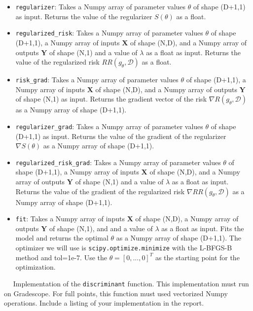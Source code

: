 \documentclass[11pt]{article}
\newcommand{\mbf}[1]{{\mathbf{#1}}}
\begin{document}
\begin{problem}{50}
\begin{itemize}
\item  \verb|regularizer|: Takes a Numpy array of parameter values $\theta$ of shape (D+1,1) as input. Returns the value of the regularizer $S(\theta)$ as a float.

\item  \verb|regularized_risk|: Takes a Numpy array of parameter values $\theta$ of shape (D+1,1), a Numpy array of inputs $\mbf{X}$ of shape (N,D), and a Numpy array of outputs $\mbf{Y}$ of shape (N,1) and a value of $\lambda$ as a float as input. Returns the value of the regularized risk $RR(g_{\theta},\mathcal{D})$ as a float.

\item  \verb|risk_grad|: Takes a Numpy array of parameter values $\theta$ of shape (D+1,1),  a Numpy array of inputs $\mbf{X}$ of shape (N,D), and a Numpy array of outputs $\mbf{Y}$ of shape (N,1) as input. Returns the gradient vector of the risk $\nabla R(g_{\theta},\mathcal{D})$ as a Numpy array of shape (D+1,1).

\item  \verb|regularizer_grad|: Takes a Numpy array of parameter values $\theta$ of shape (D+1,1) as input. Returns the value of the gradient of the regularizer $\nabla S(\theta)$  as a Numpy array of shape (D+1,1).

\item  \verb|regularized_risk_grad|: Takes a Numpy array of parameter values $\theta$ of shape (D+1,1), a Numpy array of inputs $\mbf{X}$ of shape (N,D), and a Numpy array of outputs $\mbf{Y}$ of shape (N,1) and a value of $\lambda$ as a float as input. Returns the value of the gradient of the regularized risk $\nabla RR(g_{\theta},\mathcal{D})$  as a Numpy array of shape (D+1,1).

\item  \verb|fit|: Takes a Numpy array of inputs $\mbf{X}$ of shape (N,D), a Numpy array of outputs $\mbf{Y}$ of shape (N,1), and and a value of $\lambda$ as a float as input. Fits the model and returns the optimal $\theta$ as a Numpy array of shape (D+1,1). The optimizer we will use is \verb|scipy.optimize.minimize| with the L-BFGS-B method and tol=1e-7. Use the $\theta=[0,...,0]^T$ as the starting point for the optimization.

\end{itemize}

~~ Implementation of the \verb|discriminant| function. This implementation must run on Gradescope. For full points, this function must used vectorized Numpy operations. Include a listing of your implementation in the report.\\


\end{problem}
\end{document}

